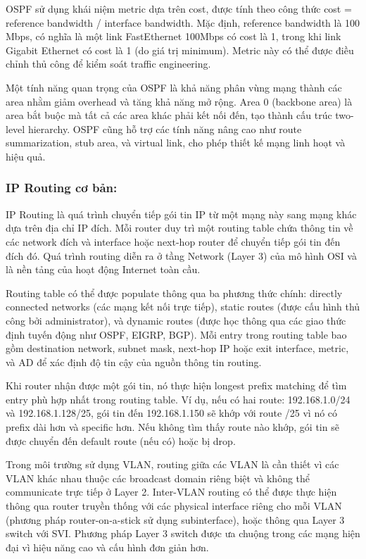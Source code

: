     OSPF sử dụng khái niệm metric dựa trên cost, được tính theo công thức cost = reference bandwidth / interface bandwidth\cite{Cisco-OSPF-7039-1}. Mặc định, reference bandwidth là 100 Mbps, có nghĩa là một link FastEthernet 100Mbps có cost là 1, trong khi link Gigabit Ethernet có cost là 1 (do giá trị minimum). Metric này có thể được điều chỉnh thủ công để kiểm soát traffic engineering.
    
    Một tính năng quan trọng của OSPF là khả năng phân vùng mạng thành các area nhằm giảm overhead và tăng khả năng mở rộng\cite{GeeksforGeeks-OSPF}. Area 0 (backbone area) là area bắt buộc mà tất cả các area khác phải kết nối đến, tạo thành cấu trúc two-level hierarchy. OSPF cũng hỗ trợ các tính năng nâng cao như route summarization, stub area, và virtual link, cho phép thiết kế mạng linh hoạt và hiệu quả\cite{Cisco-OSPF-7039-1}.
\subsubsection{IP Routing cơ bản:}
    IP Routing là quá trình chuyển tiếp gói tin IP từ một mạng này sang mạng khác dựa trên địa chỉ IP đích\cite{Cloudflare-Routing}\cite{CompTIA-Routing}. Mỗi router duy trì một routing table chứa thông tin về các network đích và interface hoặc next-hop router để chuyển tiếp gói tin đến đích đó. Quá trình routing diễn ra ở tầng Network (Layer 3) của mô hình OSI và là nền tảng của hoạt động Internet toàn cầu.
    
    Routing table có thể được populate thông qua ba phương thức chính: directly connected networks (các mạng kết nối trực tiếp), static routes (được cấu hình thủ công bởi administrator), và dynamic routes (được học thông qua các giao thức định tuyến động như OSPF, EIGRP, BGP)\cite{CompTIA-Routing}. Mỗi entry trong routing table bao gồm destination network, subnet mask, next-hop IP hoặc exit interface, metric, và AD để xác định độ tin cậy của nguồn thông tin routing.
    
    Khi router nhận được một gói tin, nó thực hiện longest prefix matching để tìm entry phù hợp nhất trong routing table. Ví dụ, nếu có hai route: 192.168.1.0/24 và 192.168.1.128/25, gói tin đến 192.168.1.150 sẽ khớp với route /25 vì nó có prefix dài hơn và specific hơn. Nếu không tìm thấy route nào khớp, gói tin sẽ được chuyển đến default route (nếu có) hoặc bị drop.
    
    Trong môi trường sử dụng VLAN, routing giữa các VLAN là cần thiết vì các VLAN khác nhau thuộc các broadcast domain riêng biệt và không thể communicate trực tiếp ở Layer 2. Inter-VLAN routing có thể được thực hiện thông qua router truyền thống với các physical interface riêng cho mỗi VLAN (phương pháp router-on-a-stick sử dụng subinterface), hoặc thông qua Layer 3 switch với SVI. Phương pháp Layer 3 switch được ưa chuộng trong các mạng hiện đại vì hiệu năng cao và cấu hình đơn giản hơn.

